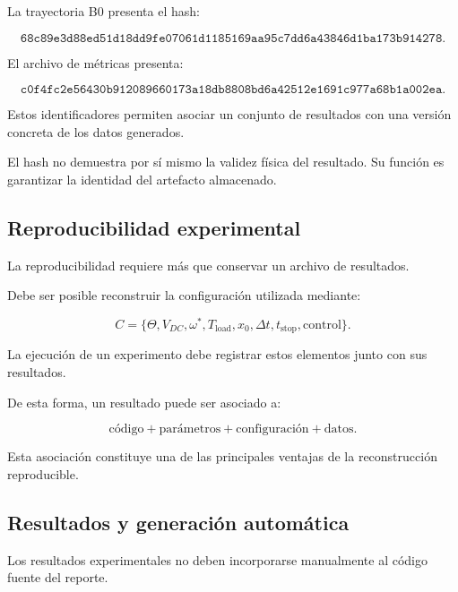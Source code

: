 La trayectoria B0 presenta el hash:

\begin{equation}
\texttt{68c89e3d88ed51d18dd9fe07061d1185169aa95c7dd6a43846d1ba173b914278}.
\end{equation}

El archivo de métricas presenta:

\begin{equation}
\texttt{c0f4fc2e56430b912089660173a18db8808bd6a42512e1691c977a68b1a002ea}.
\end{equation}

Estos identificadores permiten asociar un conjunto de resultados con una versión concreta de los datos generados.

El hash no demuestra por sí mismo la validez física del resultado. Su función es garantizar la identidad del artefacto almacenado.

\subsection{Reproducibilidad experimental}

La reproducibilidad requiere más que conservar un archivo de resultados.

Debe ser posible reconstruir la configuración utilizada mediante:

\begin{equation}
C=
\{
\Theta,
V_{DC},
\omega^\ast,
T_{\mathrm{load}},
x_0,
\Delta t,
t_{\mathrm{stop}},
\text{control}
\}.
\end{equation}

La ejecución de un experimento debe registrar estos elementos junto con sus resultados.

De esta forma, un resultado puede ser asociado a:

\begin{equation}
\text{código}
+
\text{parámetros}
+
\text{configuración}
+
\text{datos}.
\end{equation}

Esta asociación constituye una de las principales ventajas de la reconstrucción reproducible.

\subsection{Resultados y generación automática}

Los resultados experimentales no deben incorporarse manualmente al código fuente del reporte.

